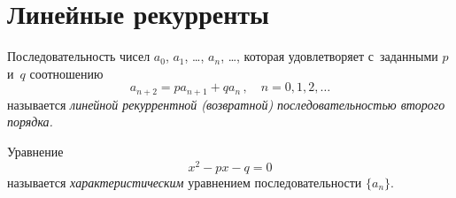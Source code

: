 
\section*{Линейные рекурренты}


Последовательность чисел $a_{0}$, $a_{1}$, \ldots, $a_{n}$, \ldots, которая
удовлетворяет с~заданными $p$ и~$q$ соотношению
\[
    a_{n+2}
=
    p a_{n+1} + q a_{n}
\, , \quad
    n = 0, 1, 2, \ldots
\]
называется
\emph{линейной рекуррентной (возвратной) последовательностью второго порядка.}

Уравнение
\[
    x^2 - p x - q = 0
\]
называется \emph{характеристическим} уравнением
последовательности $\{ a_{n}\}$.

